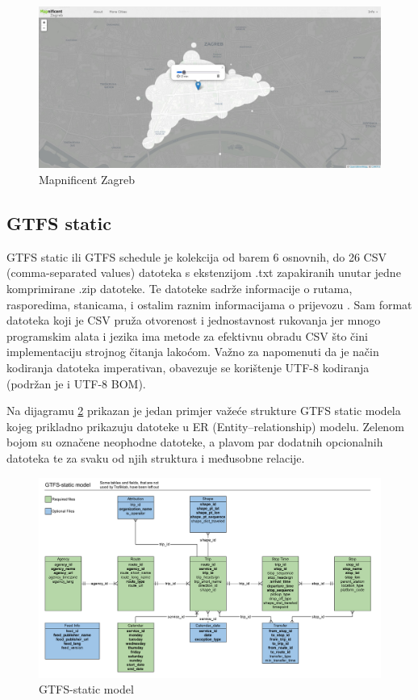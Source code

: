 \documentclass[zavrsnirad]{fer}
\begin{document}
\begin{figure}[htb]
  \centering
  \includegraphics[width=0.9\linewidth]{Figures/mapnificent-zagreb.jpg} 
  \caption{Mapnificent Zagreb}
  \label{slk:mapnificent-zagreb}
\end{figure}

\subsection{GTFS static}

GTFS static ili GTFS schedule je kolekcija od barem 6 osnovnih, do 26 CSV (comma-separated
values) datoteka s ekstenzijom .txt zapakiranih unutar jedne komprimirane .zip datoteke. Te datoteke
sadrže informacije o rutama, rasporedima, stanicama, i ostalim raznim informacijama o prijevozu \cite{GTFS-schedule}. Sam format datoteka koji je CSV pruža otvorenost i jednostavnost rukovanja jer mnogo programskim alata i jezika ima metode za efektivnu obradu CSV što čini implementaciju strojnog čitanja lakoćom. Važno za napomenuti da je način kodiranja datoteka imperativan, obavezuje se korištenje UTF-8 kodiranja (podržan je i UTF-8 BOM).


Na dijagramu \ref{slk:gtfs-model} prikazan je jedan primjer važeće strukture GTFS static modela kojeg prikladno prikazuju datoteke u ER (Entity–relationship) modelu. Zelenom bojom su označene neophodne datoteke, a plavom par dodatnih opcionalnih datoteka te za svaku od njih struktura i međusobne relacije. 

\begin{figure}[htb]
	\centering
	\includegraphics[width=0.9\linewidth]{Figures/gtfs-model.png} 
	\caption{GTFS-static model \cite{GTFS-schedule-model}}
	\label{slk:gtfs-model}
\end{figure}
\end{document}
